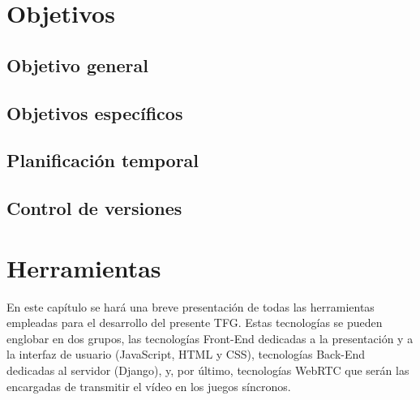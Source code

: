 \documentclass[a4paper, 12pt]{book}
\begin{document}

\cleardoublepage %
\chapter{Objetivos} %
\label{chap:objetivos} %

\section{Objetivo general} %
\label{sec:objetivo-general} %


\section{Objetivos específicos}
\label{sec:objetivos-especificos}


\section{Planificación temporal}
\label{sec:planificacion-temporal}


\section{Control de versiones}
\label{sec:control-de-versiones}




\cleardoublepage %
\chapter{Herramientas} 
\label{chap:herramientas}

En este capítulo se hará una breve presentación de todas las herramientas empleadas para el desarrollo del presente TFG. Estas tecnologías se pueden englobar en dos grupos, las tecnologías Front-End dedicadas a la presentación y a la interfaz de usuario (JavaScript, HTML y CSS), tecnologías Back-End dedicadas al servidor (Django), y, por último, tecnologías WebRTC que serán las encargadas de transmitir el vídeo en los juegos síncronos. 
\end{document}
